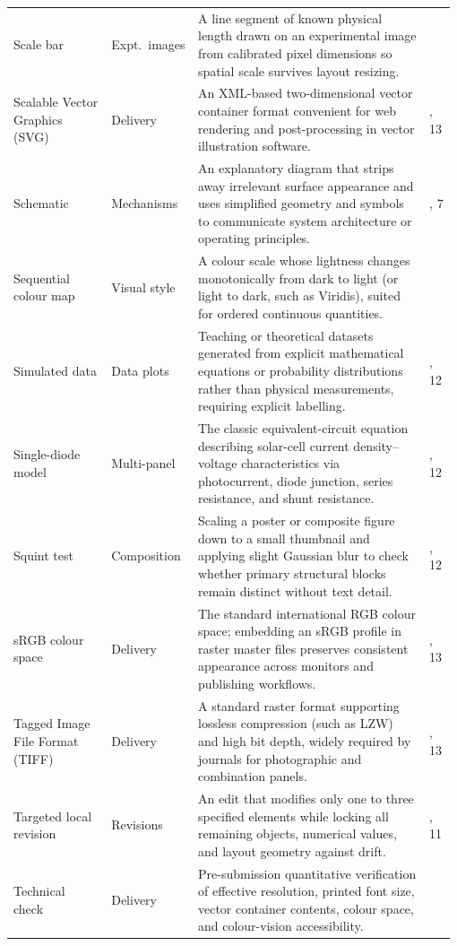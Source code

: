 \begin{longtable}{@{}>{\raggedright\arraybackslash}p{0.22\linewidth}>{\raggedright\arraybackslash}p{0.18\linewidth}>{\raggedright\arraybackslash}p{0.52\linewidth}>{\raggedright\arraybackslash}p{0.06\linewidth}@{}}
Scale bar & Expt.\ images & A line segment of known physical length drawn on an experimental image from calibrated pixel dimensions so spatial scale survives layout resizing. & 8 \\
Scalable Vector Graphics (SVG) & Delivery & An XML-based two-dimensional vector container format convenient for web rendering and post-processing in vector illustration software. & 6, 13 \\
Schematic & Mechanisms & An explanatory diagram that strips away irrelevant surface appearance and uses simplified geometry and symbols to communicate system architecture or operating principles. & 6, 7 \\
Sequential colour map & Visual style & A colour scale whose lightness changes monotonically from dark to light (or light to dark, such as Viridis), suited for ordered continuous quantities. & 4 \\
Simulated data & Data plots & Teaching or theoretical datasets generated from explicit mathematical equations or probability distributions rather than physical measurements, requiring explicit labelling. & 1, 12 \\
Single-diode model & Multi-panel & The classic equivalent-circuit equation describing solar-cell current density--voltage characteristics via photocurrent, diode junction, series resistance, and shunt resistance. & 9, 12 \\
Squint test & Composition & Scaling a poster or composite figure down to a small thumbnail and applying slight Gaussian blur to check whether primary structural blocks remain distinct without text detail. & 3, 12 \\
sRGB colour space & Delivery & The standard international RGB colour space; embedding an sRGB profile in raster master files preserves consistent appearance across monitors and publishing workflows. & 4, 13 \\
Tagged Image File Format (TIFF) & Delivery & A standard raster format supporting lossless compression (such as LZW) and high bit depth, widely required by journals for photographic and combination panels. & 8, 13 \\
Targeted local revision & Revisions & An edit that modifies only one to three specified elements while locking all remaining objects, numerical values, and layout geometry against drift. & 3, 11 \\
Technical check & Delivery & Pre-submission quantitative verification of effective resolution, printed font size, vector container contents, colour space, and colour-vision accessibility. & 13 \\

\end{longtable}
